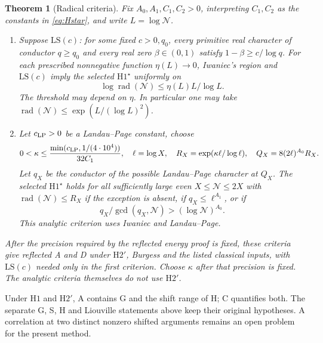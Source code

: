 \documentclass[11pt]{article}
\newtheorem{theoremF}{Theorem}
\theoremstyle{definition}
\DeclareMathOperator{\rad}{rad}
\newcommand{\GN}{\mathcal N}
\theoremstyle{remark}
\numberwithin{equation}{section}
\begin{document}
\begin{theoremF}[Radical criteria]\label{thm:F}
Fix $A_0,A_1,C_1,C_2>0$, interpreting $C_1,C_2$ as the constants
in \eqref{eq:Hstar}, and write $L=\log\GN$.
\begin{enumerate}
\item Suppose $\mathrm{LS}(c)$: for some fixed $c>0,q_0$, every
primitive real character of conductor $q\ge q_0$ and every real
zero $\beta\in(0,1)$ satisfy $1-\beta\ge c/\log q$.
For each prescribed nonnegative function $\eta(L)\to0$, Iwaniec's
region and $\mathrm{LS}(c)$ imply the selected $\mathrm H1^\star$
uniformly on
\begin{equation}\label{eq:F-envelope}
 \log\rad(\GN)\le\eta(L)L/\log L.
\end{equation}
The threshold may depend on $\eta$. In particular one may take
$\rad(\GN)\le\exp(L/(\log L)^2)$.
\item Let $c_{\rm LP}>0$ be a Landau--Page constant, choose
\begin{equation}\label{eq:F-kappa}
 0<\kappa\le\frac{\min(c_{\rm LP},1/(4\cdot10^4))}{32C_1},
 \quad \ell=\log X,\quad
 R_X=\exp(\kappa\ell/\log\ell),\quad Q_X=8(2\ell)^{A_0}R_X.
\end{equation}
Let $q_X$ be the conductor of the possible Landau--Page character
at $Q_X$. The selected $\mathrm H1^\star$ holds for all sufficiently
large even $X\le\GN\le2X$ with $\rad(\GN)\le R_X$ if the
exception is absent, if $q_X\le\ell^{A_1}$, or if
\begin{equation}\label{eq:F-avoid}
 q_X/\gcd(q_X,\GN)>(\log\GN)^{A_0}.
\end{equation}
This analytic criterion uses Iwaniec and Landau--Page.
\end{enumerate}
After the precision required by the reflected energy proof is fixed,
these criteria give reflected A and D under $\mathrm H2'$,
Burgess and the listed classical inputs, with $\mathrm{LS}(c)$
needed only in the first criterion. Choose $\kappa$ after that
precision is fixed. The analytic criteria themselves do not use
$\mathrm H2'$.
\end{theoremF}

Under $\mathrm H1$ and $\mathrm H2'$, A contains G and the shift
range of H; C quantifies both. The separate G, S, H and Liouville
statements above keep their original hypotheses. A correlation at
two distinct nonzero shifted arguments remains an open problem
for the present method.
\end{document}
